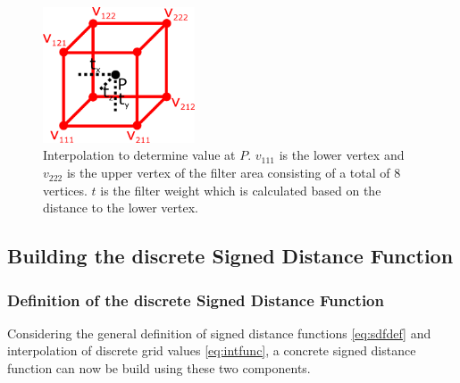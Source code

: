 \documentclass[12pt]{article}
\begin{document}
\begin{figure}[h]
	\centering
	\includegraphics[width=0.4\textwidth]{images/interpolation}
	\caption{Interpolation to determine value at $P$. $v_{111}$ is the lower vertex and $v_{222}$ is the upper vertex of the filter area consisting of a total of 8 vertices. $t$ is the filter weight which is calculated based on the distance to the lower vertex.}
	\label{fig:interpolation}
\end{figure}

\subsection{Building the discrete Signed Distance Function}
\subsubsection{Definition of the discrete Signed Distance Function}
Considering the general definition of signed distance functions \eqref{eq:sdfdef} and interpolation of discrete grid values \eqref{eq:intfunc}, a concrete signed distance function can now be build using these two components.
\end{document}
